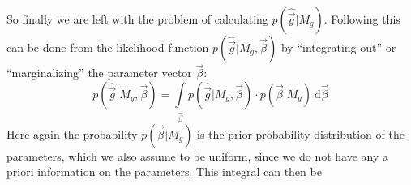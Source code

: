 \documentclass[a4paper,notitlepage]{article}
\begin{document}
So finally we are left with the problem of calculating $p(\hat{\vec{g}}|M_g)$. Following  \cite{HE2012} this can be done from the likelihood function $p(\hat{\vec{g}}|M_g,\vec{\beta})$ by ``integrating out'' or ``marginalizing'' the parameter vector $\vec{\beta}$:
\begin{equation}\label{eq:bayes_propfromlikelihood}
    p(\hat{\vec{g}}|M_g,\vec{\beta})=\int\limits_{\vec{\beta}} p(\hat{\vec{g}}|M_g,\vec{\beta})\cdot p(\vec{\beta}|M_g)\ \mathrm{d}\vec{\beta}
\end{equation}
Here again the probability $p(\vec{\beta}|M_g)$ is the prior probability distribution of the parameters, which we also assume to be uniform, since we do not have any a priori information on the parameters. This integral can then be 





\newpage


\end{document}
